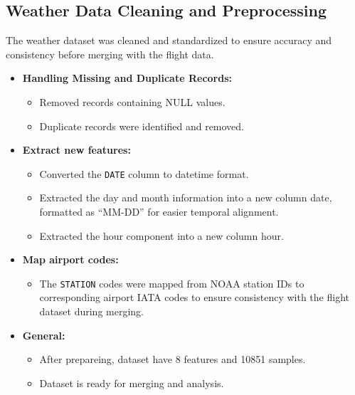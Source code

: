 \documentclass[a4paper,12pt]{report}
\begin{document}
\subsection{Weather Data Cleaning and Preprocessing}
The weather dataset was cleaned and standardized to ensure accuracy and consistency before merging with the flight data.
\begin{itemize}
    \item \textbf{Handling Missing and Duplicate Records:}
    \begin{itemize}
        \item{Removed records containing NULL values.}
        \item{Duplicate records were identified and removed.}
    \end{itemize}
    \item \textbf{Extract new features:}
    \begin{itemize}
        \item{Converted the \texttt{DATE} column to datetime format.}
        \item {Extracted the day and month information into a new column date, formatted as “MM-DD” for easier temporal alignment.}
        \item {Extracted the hour component into a new column hour.}
    \end{itemize}
    \item \textbf{Map airport codes:}
    \begin{itemize}
        \item{The \texttt{STATION} codes were mapped from NOAA station IDs to corresponding airport IATA codes to ensure consistency with the flight dataset during merging.}
    \end{itemize}
    \item \textbf{General:}
    \begin{itemize}
        \item{After prepareing, dataset have 8 features and 10851 samples.}
        \item {Dataset is ready for merging and analysis.}
    \end{itemize}
\end{itemize}
\end{document}
